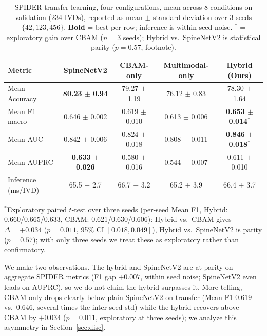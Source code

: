 \documentclass[runningheads]{llncs}
\newcommand{\best}[1]{\textbf{#1}}
\begin{document}
\begin{table}[htbp]
\centering
\caption{SPIDER transfer learning, four configurations, mean across 8 conditions on validation (234 IVDs), reported as mean $\pm$ standard deviation over 3 seeds $\{42, 123, 456\}$. \textbf{Bold} = best per row; inference is within seed noise. $^\ast$ = exploratory gain over CBAM ($n=3$ seeds); Hybrid vs.\ SpineNetV2 is statistical parity ($p=0.57$, footnote).}
\label{tab:spider_transfer_agg}
\footnotesize
\begin{tabular}{@{}lcccc@{}}
\toprule
\textbf{Metric} & \textbf{SpineNetV2} & \textbf{CBAM-only} & \textbf{Multimodal-only} & \textbf{Hybrid (Ours)} \\
\midrule
Mean Accuracy & \best{80.23 $\pm$ 0.94} & 79.27 $\pm$ 1.19 & 76.12 $\pm$ 0.83 & 78.30 $\pm$ 1.64 \\
Mean F1 macro & 0.646 $\pm$ 0.002 & 0.619 $\pm$ 0.010 & 0.613 $\pm$ 0.006 & \best{0.653 $\pm$ 0.014}$^\ast$ \\
Mean AUC      & 0.842 $\pm$ 0.006 & 0.824 $\pm$ 0.018 & 0.808 $\pm$ 0.011 & \best{0.846 $\pm$ 0.018}$^\ast$ \\
Mean AUPRC    & \best{0.633 $\pm$ 0.026} & 0.580 $\pm$ 0.016 & 0.544 $\pm$ 0.007 & 0.611 $\pm$ 0.010 \\
\midrule
Inference (ms/IVD) & 65.5 $\pm$ 2.7 & 66.7 $\pm$ 3.2 & 65.2 $\pm$ 3.9 & 66.4 $\pm$ 3.7 \\
\bottomrule
\end{tabular}

\vspace{2pt}
{\raggedright\scriptsize
$^\ast$Exploratory paired $t$-test over three seeds (per-seed Mean F1, Hybrid: 0.660/0.665/0.633, CBAM: 0.621/0.630/0.606): Hybrid vs.\ CBAM gives $\Delta=+0.034$ ($p=0.011$, 95\% CI $[0.018,0.049]$), Hybrid vs.\ SpineNetV2 is parity ($p=0.57$); with only three seeds we treat these as exploratory rather than confirmatory.\par}
\end{table}

We make two observations. The hybrid and SpineNetV2 are at parity on aggregate SPIDER metrics (F1 gap $+0.007$, within seed noise; SpineNetV2 even leads on AUPRC), so we do not claim the hybrid surpasses it. More telling, CBAM-only drops clearly below plain SpineNetV2 on transfer (Mean F1 $0.619$ vs.\ $0.646$, several times the inter-seed std) while the hybrid recovers above CBAM by $+0.034$ ($p=0.011$, exploratory at three seeds); we analyze this asymmetry in Section~\ref{sec:disc}.
\end{document}
